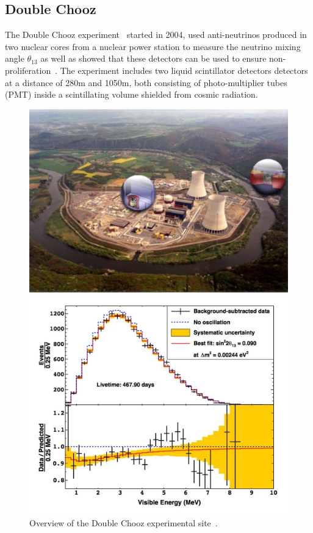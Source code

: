 \subsection{Double Chooz}
The Double Chooz experiment~\cite{45DoubleChooz} started in 2004, used anti-neutrinos produced in two nuclear cores from a nuclear power station to measure the neutrino mixing angle $\theta_{13}$ as well as showed that these detectors can be used to ensure non-proliferation~\cite{45DoubleChooz, 66ReactorNP}. The experiment includes two liquid scintillator detectors detectors at a distance of 280m and 1050m, both consisting of photo-multiplier tubes (PMT) inside a scintillating volume shielded from cosmic radiation. 

\begin{figure}[h!]
  \centering
  \begin{minipage}[b]{0.49\textwidth}
    \includegraphics[width=\textwidth]{figures/doubleChooz.jpeg}
    \vspace{2mm}
    \caption{Overview of the Double Chooz experimental site~\cite{45DoubleChooz}.}
    \label{fig:dc}
  \end{minipage}
  \hfill
  \begin{minipage}[b]{0.49\textwidth}
    \includegraphics[width=\textwidth]{figures/doubleChooz2.jpeg}

\end{minipage}
\end{figure}
